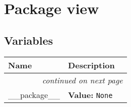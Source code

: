 %
%
%


\section{Package view}

    \label{view}


  \subsection{Variables}

    \vspace{-1cm}
\hspace{\varindent}\begin{longtable}{|p{\varnamewidth}|p{\vardescrwidth}|l}
\cline{1-2}
\cline{1-2} \centering \textbf{Name} & \centering \textbf{Description}& \\
\cline{1-2}
\endhead\cline{1-2}\multicolumn{3}{r}{\small\textit{continued on next page}}\\\endfoot\cline{1-2}
\endlastfoot\raggedright \_\-\_\-p\-a\-c\-k\-a\-g\-e\-\_\-\_\- & \raggedright \textbf{Value:} 
{\tt None}&\\
\cline{1-2}
\end{longtable}

